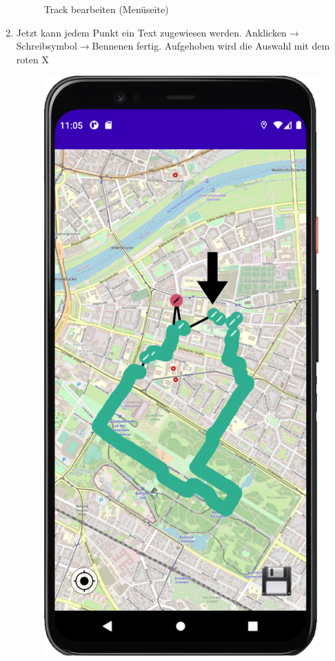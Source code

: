 \documentclass{article}
\begin{document}
\begin{enumerate}
\begin{figure}[H]
			\centering
			\caption{Track bearbeiten (Menüseite)}
	        \end{figure}
		\item Jetzt kann jedem Punkt ein Text zugewiesen werden. Anklicken$\rightarrow$ Schreibsymbol$\rightarrow$Bennenen fertig. Aufgehoben wird die Auswahl mit dem roten X
		\begin{figure}[H]
			\captionsetup{justification=centering}
				\includegraphics[width=\linewidth]{spoi_pic3_1.png}

\end{figure}
\end{enumerate}
\end{document}
